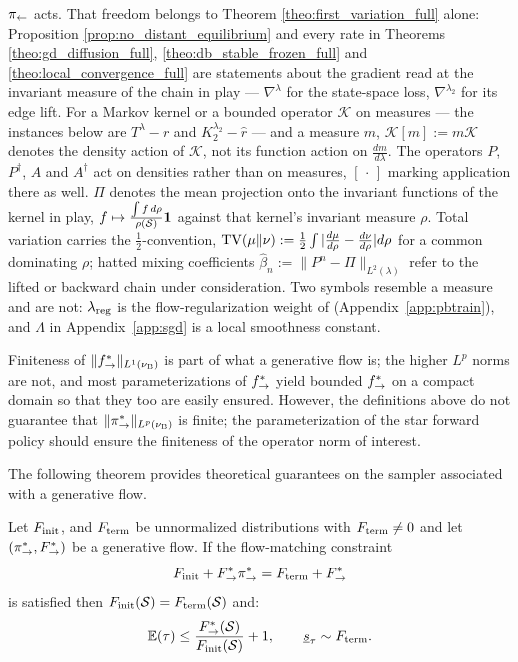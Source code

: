 $\pi_{\leftarrow}$ acts. That freedom belongs to Theorem \ref{theo:first_variation_full} alone: Proposition \ref{prop:no_distant_equilibrium} and every rate in Theorems \ref{theo:gd_diffusion_full}, \ref{theo:db_stable_frozen_full} and \ref{theo:local_convergence_full} are statements about the gradient read at the invariant measure of the chain in play --- $\nabla^\lambda$ for the state-space loss, $\nabla^{\lambda_2}$ for its edge lift. For a Markov kernel or a bounded operator $\mathcal K$ on measures --- the instances below are $T^\lambda-r$ and $K_2^{\lambda_2}-\widehat r$ --- and a measure $m$, $\mathcal K[m]:=m\mathcal K$ denotes the density action of $\mathcal K$, not its function action on $\frac{dm}{d\lambda}$. The operators $P$, $P^\dagger$, $A$ and $A^\dagger$ act on densities rather than on measures, $[\,\cdot\,]$ marking application there as well. $\Pi$ denotes the mean projection onto the invariant functions of the kernel in play, $f\mapsto\frac{\int f\,d\rho}{\rho(\mathcal S)}\mathbf 1$ against that kernel's invariant measure $\rho$. Total variation carries the $\tfrac12$-convention, $\mathrm{TV}(\mu\|\nu):=\tfrac12\int|\frac{d\mu}{d\rho}-\frac{d\nu}{d\rho}|d\rho$ for a common dominating $\rho$; hatted mixing coefficients $\widehat\beta_n:=\|P^n-\Pi\|_{L^2(\lambda)}$ refer to the lifted or backward chain under consideration. Two symbols resemble a measure and are not: $\lambda_{\mathrm{reg}}$ is the flow-regularization weight of \citet{morozov2025revisiting} (Appendix~\ref{app:pbtrain}), and $\Lambda$ in Appendix~\ref{app:sgd} is a local smoothness constant.

Finiteness of $\|f^*_{\rightarrow}\|_{L^1(\nu_{\mathrm{B}})}$ is part of what a generative flow is; the higher $L^p$ norms are not, and most parameterizations of $f^*_{\rightarrow}$ yield bounded $f^*_{\rightarrow}$ on a compact domain so that they too are easily ensured. However, the definitions above do not guarantee that $\|\pi_{\rightarrow}^*\|_{L^p(\nu_{\mathrm{B}})}$ is finite; the parameterization of the star forward policy should ensure the finiteness of the operator norm of interest.

The following theorem  provides theoretical guarantees on the sampler associated with a generative flow.

    \begin{theorem}
         \label{theo:sampling_theorem}
        Let $F_{\mathrm{init}}$, and $F_{\mathrm{term}}$ be unnormalized distributions with $F_{\mathrm{term}}\neq0$ and let $(\pi_{\rightarrow}^*, F^*_{\rightarrow})$ be a generative flow. If the flow-matching constraint
        \begin{equation}
            F_{\mathrm{init}} + F^*_{\rightarrow}\pi_{\rightarrow}^* = F_{\mathrm{term}} + F^*_{\rightarrow}
        \end{equation}
        is satisfied then $F_{\mathrm{init}}(\mathcal S)=F_{\mathrm{term}}(\mathcal S)$ and:
        \begin{equation}
            \mathbb E(\tau)\leq \frac{F^*_{\rightarrow}(\mathcal S)}{F_{\mathrm{init}}(\mathcal S)}+1,\quad \quad \underline s_\tau \sim F_{\mathrm{term}}. \nonumber
        \end{equation}

    \end{theorem}




